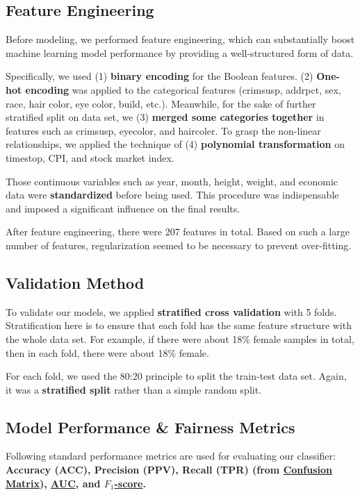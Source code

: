 \subsection{Feature Engineering}
Before modeling, we performed feature engineering, which can substantially boost machine learning model performance by providing a well-structured form of data. 

Specifically, we used (1) \textbf{binary encoding} for the Boolean features. (2) \textbf{One-hot encoding} was applied to the categorical features (crimsusp, addrpct, sex, race, hair color, eye color, build, etc.). Meanwhile, for the sake of further stratified split on data set, we (3) \textbf{merged some categories together} in features such as crimsusp, eyecolor, and haircoler. To grasp the non-linear relationships, we applied the technique of (4) \textbf{polynomial transformation} on timestop, CPI, and stock market index.

Those continuous variables such as year, month, height, weight, and economic data were \textbf{standardized} before being used. This procedure was indispensable and imposed a significant influence on the final results.

After feature engineering, there were 207 features in total. Based on such a large number of features, regularization seemed to be necessary to prevent over-fitting.

\subsection{Validation Method}
To validate our models, we applied \textbf{stratified cross validation} with 5 folds. Stratification here is to ensure that each fold has the same feature structure with the whole data set. For example, if there were about 18\% female samples in total, then in each fold, there were about 18\% female. 

For each fold, we used the 80:20 principle to split the train-test data set. Again, it was a \textbf{stratified split} rather than a simple random split.

\subsection{Model Performance \& Fairness Metrics}

Following standard performance metrics are used for evaluating our classifier: \textbf{Accuracy (ACC), Precision (PPV), Recall (TPR) (from \href{https://en.wikipedia.org/wiki/Confusion_matrix}{Confusion Matrix}), \href{https://en.wikipedia.org/wiki/Receiver_operating_characteristic}{AUC}, and \href{https://en.wikipedia.org/wiki/F1_score}{$F_1$-score}.}

